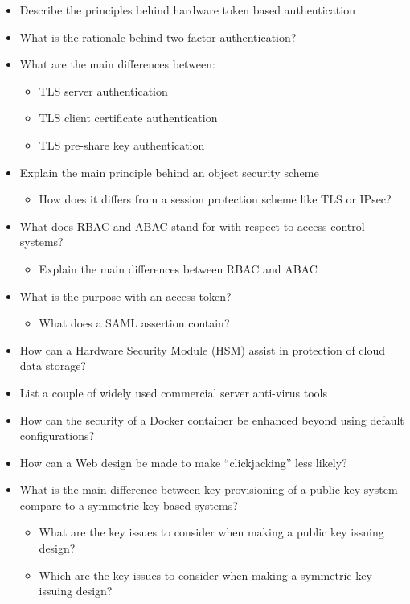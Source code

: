 \begin{itemize}
\item Describe the principles behind hardware token based authentication
\item What is the rationale behind two factor authentication?
\item What are the main differences between:
  \begin{itemize}[noitemsep]
  \item TLS server authentication
  \item TLS client certificate authentication
  \item TLS pre-share key authentication
  \end{itemize}

\item Explain the main principle behind an object security scheme
  \begin{itemize}[noitemsep]
  \item How does it differs from a session protection scheme like TLS or IPsec?
  \end{itemize}

\item What does RBAC and ABAC stand for with respect to access control systems?
  \begin{itemize}[noitemsep]
  \item Explain the main differences between RBAC and ABAC
  \end{itemize}

\item What is the purpose with an access token?
  \begin{itemize}[noitemsep]
  \item What does a SAML assertion contain?
  \end{itemize}

\item How can a Hardware Security Module (HSM) assist in protection of cloud data storage?
\item List a couple of widely used commercial server anti-virus tools
\item How can the security of a Docker container be enhanced beyond using default configurations?
\item How can a Web design be made to make ``clickjacking'' less likely?
\item What is the main difference between key provisioning of a public key system compare to a symmetric key-based systems?
  \begin{itemize}[noitemsep]
  \item What are the key issues to consider when making a public key issuing design?
  \item Which are the key issues to consider when making a symmetric key issuing design?
  \end{itemize}


\end{itemize}
